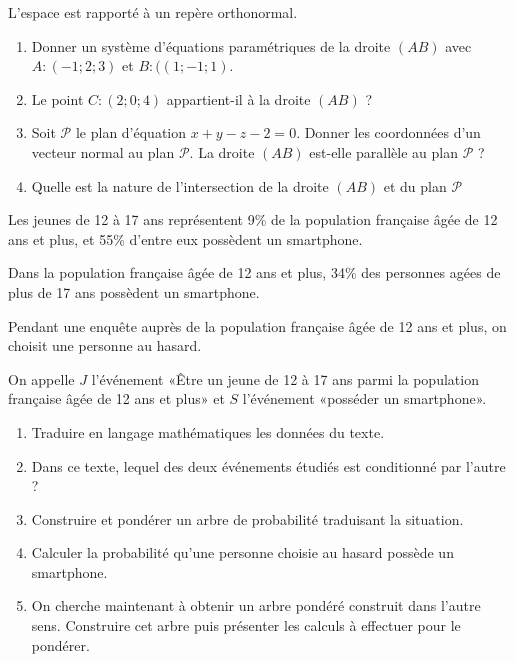 \begin{question}[topic=géométrie]
  L'espace est rapporté à un repère orthonormal.

  \begin{enumerate}
    \item Donner un système d'équations paramétriques de la droite $(AB)$
      avec $A : (-1; 2; 3)$ et $B : ((1; -1 ; 1)$.
      \item Le point $C : (2;0;4)$ appartient-il à la droite $(AB)$ ?
    \item Soit $\mathcal{P}$ le plan d'équation $x + y - z - 2  = 0$. Donner
      les coordonnées d'un vecteur normal au plan $\mathcal{P}$. La droite
      $(AB)$ est-elle parallèle au plan $\mathcal{P}$ ?
    \item Quelle est la nature de l'intersection de la droite $(AB)$ et du
      plan $\mathcal{P}$
  \end{enumerate}
\end{question}

\begin{question}[topic=probabilité]
  Les jeunes de 12 à 17 ans représentent 9\% de la population française âgée
  de 12 ans et plus, et 55\% d'entre eux possèdent un smartphone.

  Dans la population française âgée de 12 ans et plus, 34\% des personnes
  agées de plus de 17 ans possèdent un smartphone.

  Pendant une enquête auprès de la population française âgée de 12 ans et
  plus, on choisit une personne au hasard.

  On appelle $J$ l'événement «Être un jeune de 12 à 17 ans parmi la
  population française âgée de 12 ans et plus» et $S$ l'événement «posséder
  un smartphone».

  \begin{enumerate}
    \item Traduire en langage mathématiques les données du texte.
    \item Dans ce texte, lequel des deux événements étudiés est conditionné
      par l'autre ?
    \item Construire et pondérer un arbre de probabilité traduisant la
      situation.
    \item Calculer la probabilité qu'une personne choisie au hasard possède
      un smartphone.
    \item On cherche maintenant à obtenir un arbre pondéré construit dans
      l'autre sens. Construire cet arbre puis présenter les calculs à
      effectuer pour le pondérer.
  \end{enumerate}
\end{question}

